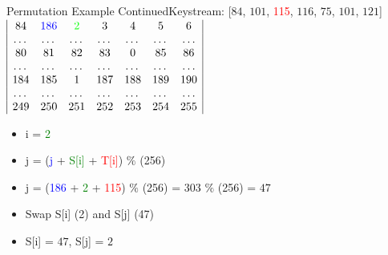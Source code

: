 \documentclass[
	aspectratio=169,	%
	onlytextwidth,		%
	t,					%
	]{beamer}
\begin{document}
\begin{frame}{Permutation Example Continued}{Keystream: [$84$, $101$, \textcolor{red} {115}, $116$, $75$, $101$, $121$]}
	$\begin{array}{|ccccccc|}
		84 & \textcolor{blue} {186} & \textcolor{green}{2} & 3 & 4 & 5 & 6 \\
		\dots & \dots & \dots & \dots & \dots & \dots & \dots \\
		80 & 81 & 82 & 83 & 0 & 85 & 86 \\
		\dots & \dots & \dots & \dots & \dots & \dots & \dots \\
		184 & 185 & 1 & 187 & 188 & 189 & 190\\
		\dots & \dots & \dots & \dots & \dots & \dots & \dots \\
		249 & 250 & 251 & 252 & 253 & 254 & 255 \\
	\end{array}$
	\begin{itemize}
		\item i = \textcolor{green}{2}
		\item j = (\textcolor{blue} {j} + \textcolor{green}{S[i]} + \textcolor{red}{T[i]}) $\%$ (256)
		\item j = (\textcolor{blue} {186} + \textcolor{green} {2} + \textcolor{red} {115}) $\%$ (256) = 303 $\%$ (256) = $47$
		\item Swap S[i] (2) and S[j] (47)
		\item S[i] = $47$, S[j] = $2$
	\end{itemize}
\end{frame}
\end{document}
